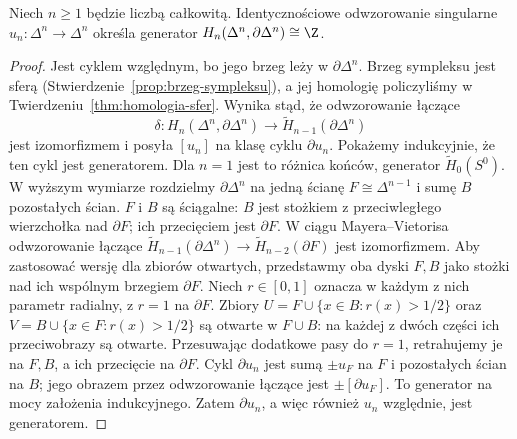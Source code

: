 \begin{lemat}
\label{lem:orientacja-simpleksu}
Niech $n\geq1$ będzie liczbą całkowitą.
Identycznościowe odwzorowanie singularne
$u_n:\Delta^n\to\Delta^n$ określa
generator
$H_n(\Delta^n,\partial\Delta^n)\cong\Z$.
\end{lemat}
\begin{proof}
Jest cyklem względnym, bo jego
brzeg leży w $\partial\Delta^n$.
Brzeg sympleksu jest sferą
(Stwierdzenie~\ref{prop:brzeg-sympleksu}),
a jej homologię policzyliśmy
w Twierdzeniu~\ref{thm:homologia-sfer}.
Wynika stąd, że odwzorowanie łączące
\[
 \delta:H_n(\Delta^n,\partial\Delta^n)
 \longrightarrow
 \widetilde H_{n-1}(\partial\Delta^n)
 \]
jest izomorfizmem i posyła
$[u_n]$ na klasę cyklu
$\partial u_n$.
Pokażemy indukcyjnie, że ten
cykl jest generatorem.
Dla $n=1$ jest to różnica
końców, generator
$\widetilde H_0(S^0)$.
W wyższym wymiarze rozdzielmy
$\partial\Delta^n$ na jedną
ścianę $F\cong\Delta^{n-1}$
i sumę $B$ pozostałych ścian.
$F$ i $B$ są ściągalne:
$B$ jest stożkiem z przeciwległego
wierzchołka nad $\partial F$;
ich przecięciem jest $\partial F$.
W ciągu Mayera--Vietorisa
odwzorowanie łączące
$\widetilde H_{n-1}(\partial\Delta^n)
\to\widetilde H_{n-2}(\partial F)$
jest izomorfizmem. Aby zastosować wersję dla zbiorów otwartych, przedstawmy
oba dyski $F,B$ jako stożki nad ich wspólnym brzegiem $\partial F$.
Niech $r\in[0,1]$ oznacza w każdym z nich parametr radialny,
z $r=1$ na $\partial F$. Zbiory
$U=F\cup\{x\in B:r(x)>1/2\}$ oraz
$V=B\cup\{x\in F:r(x)>1/2\}$ są otwarte w $F\cup B$:
na każdej z dwóch części ich przeciwobrazy są otwarte.
Przesuwając dodatkowe pasy do $r=1$, retrahujemy je na $F,B$,
a ich przecięcie na $\partial F$.
Cykl $\partial u_n$ jest sumą
$\pm u_F$ na $F$ i pozostałych
ścian na $B$; jego obrazem przez
odwzorowanie łączące jest
$\pm[\partial u_F]$.
To generator na mocy
założenia indukcyjnego.
Zatem $\partial u_n$, a więc
również $u_n$ względnie,
jest generatorem.
\end{proof}

